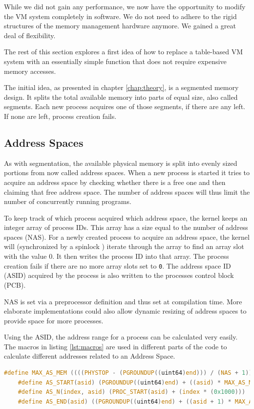 While we did not gain any performance, we now have the opportunity to modify the VM system
completely in software. We do not need to adhere to the rigid structures \cite{tanenbaumOS} of the memory management hardware anymore.
We gained a great deal of flexibility.

The rest of this section explores a first idea of how to replace a table-based VM system with an essentially simple function that does not require expensive memory accesses.

The initial idea, as presented in chapter \cref{chap:theory}, is a segmented memory design. It splits the total
available memory into parts of equal size, also called segments.
Each new process acquires one of those segments, if there are any left. If none are left, process creation fails.


\subsection{Address Spaces}
As with segmentation, the available physical memory is split into evenly sized portions \cite{tanenbaumOS}from now called address spaces. When a new process is started it tries to acquire an address space by
checking whether there is a free one and then claiming that free address space.
The number of address spaces will thus limit the number of concurrently running programs.

To keep track of which process acquired which address space, the kernel keeps an integer array of process IDs.
This array has a size equal to the number of address spaces (NAS).
For a newly created process to acquire an address space, the kernel will (synchronized by a spinlock \cite{cox2011xv6})
iterate through the array to find an array slot with the value 0. It then writes the process ID into that array.
The process creation fails if there are no more array slots set to \texttt{0}.
The address space ID (ASID) acquired by the process is also written to the processes control block (PCB).

NAS is set via a preprocessor definition and thus set at compilation time. More elaborate implementations
could also allow dynamic resizing of address spaces to provide space for more processes.

Using the ASID, the address range for a process can be calculated very easily. The macros in listing \ref{lst:macros}
are used in different parts of the code to calculate different addresses related to an Address Space.

\begin{lstlisting}[language=c,float=h!,basicstyle=\footnotesize,caption={\textbf{Simple Macros for Calculating Addresses related to Address Spaces}}
    label={lst:macros}]
    #define MAX_AS_MEM ((((PHYSTOP - (PGROUNDUP((uint64)end))) / (NAS + 1)) >> 12 )<< 12)
    #define AS_START(asid) (PGROUNDUP((uint64)end) + ((asid) * MAX_AS_MEM))
    #define AS_N(index, asid) (PROC_START(asid) + (index * (0x1000)))
    #define AS_END(asid) ((PGROUNDUP((uint64)end) + ((asid + 1) * MAX_AS_MEM))-0x1000)
\end{lstlisting}


